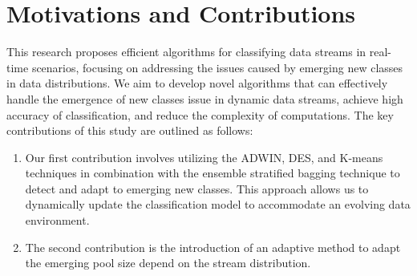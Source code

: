   \section{Motivations and Contributions} \label{sec:5_2_motivation}
  This research proposes efficient algorithms for classifying data streams in real-time scenarios, focusing on addressing the issues caused by emerging new classes in data distributions. We aim to develop novel algorithms that can effectively handle the emergence of new classes issue in dynamic data streams, achieve high accuracy of classification, and reduce the complexity of computations. The key contributions of this study are outlined as follows:
  \begin{enumerate}[nosep]
    \item Our first contribution involves utilizing the ADWIN, DES, and K-means techniques in combination with the ensemble stratified bagging technique to detect and adapt to emerging new classes. This approach allows us to dynamically update the classification model to accommodate an evolving data environment.
   \item The second contribution is the introduction of an adaptive method to adapt the emerging pool size depend on the stream distribution.
    \end{enumerate} 
   
     
  
  
 
   

